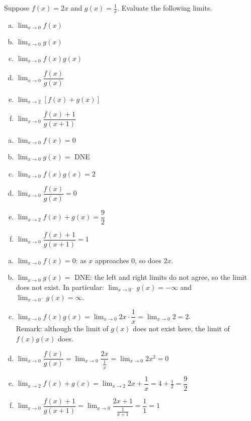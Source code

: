 \begin{Mquestion}Suppose $f(x)=2x$ and $g(x)=\frac{1}{x}$. Evaluate the following limits.\begin{enumerate}[(a)]
\item $\displaystyle\lim_{x \rightarrow 0} f(x)$
\item $\displaystyle\lim_{x \rightarrow 0} g(x)$
\item $\displaystyle\lim_{x \rightarrow 0} f(x)g(x)$
\item $\displaystyle\lim_{x \rightarrow 0} \dfrac{f(x)}{g(x)}$
\item $\displaystyle\lim_{x \rightarrow 2} [f(x)+g(x)]$
\item $\displaystyle\lim_{x \rightarrow 0} \dfrac{f(x)+1}{g(x+1)}$
\end{enumerate}
\end{Mquestion}
\begin{answer}
\begin{enumerate}[(a)]
\item $\displaystyle\lim_{x \rightarrow 0} f(x)=0$
\item $\displaystyle\lim_{x \rightarrow 0} g(x)=$ DNE
\item $\displaystyle\lim_{x \rightarrow 0} f(x)g(x)=2$
\item $\displaystyle\lim_{x \rightarrow 0} \dfrac{f(x)}{g(x)}=0$
\item $\displaystyle\lim_{x \rightarrow 2} f(x)+g(x)=\dfrac{9}{2}$
\item $\displaystyle\lim_{x \rightarrow 0} \dfrac{f(x)+1}{g(x+1)}=1$
\end{enumerate}
\end{answer}
\begin{solution}
\begin{enumerate}[(a)]
\item $\displaystyle\lim_{x \rightarrow 0} f(x)=0$: as $x$ approaches 0, so does $2x$.
\item $\displaystyle\lim_{x \rightarrow 0} g(x)=$ DNE: the left and right limits do not agree, so the limit does not exist. In particular: $\displaystyle\lim_{x \rightarrow 0^-} g(x)=-\infty$ and $\displaystyle\lim_{x \rightarrow 0^-} g(x)=\infty$.
\item $\displaystyle\lim_{x \rightarrow 0} f(x)g(x)=\displaystyle\lim_{x \rightarrow 0} 2x\cdot\dfrac{1}{x}=\displaystyle\lim_{x \rightarrow 0} 2=2$. \\
Remark:  although the limit of $g(x)$ does not exist here, the limit of $f(x)g(x)$ does.
\item $\displaystyle\lim_{x \rightarrow 0} \dfrac{f(x)}{g(x)}=\displaystyle\lim_{x \rightarrow 0} \dfrac{2x}{\frac{1}{x}}=\displaystyle\lim_{x \rightarrow 0} 2x^2=0$
\item $\displaystyle\lim_{x \rightarrow 2} f(x)+g(x)=\displaystyle\lim_{x \rightarrow 2} 2x+\dfrac{1}{x}=4+\frac{1}{2}=\dfrac{9}{2}$
\item $\displaystyle\lim_{x \rightarrow 0} \dfrac{f(x)+1}{g(x+1)}=
\displaystyle\lim_{x \rightarrow 0} \dfrac{2x+1}{\frac{1}{x+1}}=\dfrac{1}{1}=
1$
\end{enumerate}
\end{solution}

